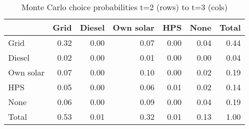 \begin{table}[!ht]
	\centering
		\caption{Monte Carlo choice probabilities t=2 (rows) to t=3 (cols)}
\begin{tabular}{lrrrrrr}
		\toprule
               &      Grid&    Diesel& Own solar&       HPS&      None&     Total\\
		\midrule
		           Grid&      0.32&      0.00&      0.07&      0.00&      0.04&      0.44\\
		         Diesel&      0.02&      0.00&      0.01&      0.00&      0.00&      0.04\\
		      Own solar&      0.07&      0.00&      0.10&      0.00&      0.02&      0.19\\
		            HPS&      0.05&      0.00&      0.06&      0.01&      0.02&      0.14\\
		           None&      0.06&      0.00&      0.09&      0.00&      0.04&      0.19\\
		          Total&      0.53&      0.01&      0.32&      0.01&      0.13&      1.00\\
		\bottomrule
	\end{tabular}
\end{table}
